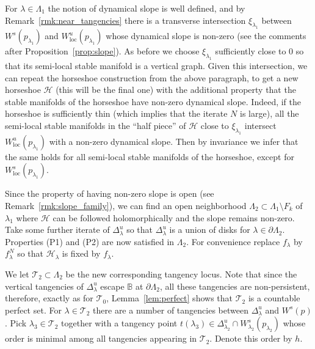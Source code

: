 \documentclass[11pt, oneside]{amsart}
\newcommand{\B}{\mathbb{B}}
\newcommand{\fr}{\partial}
\newcommand{\la}{\lambda}
\newcommand{\loc}{{\mathrm{loc}}}
\theoremstyle{remark}
\theoremstyle{definition}
\theoremstyle{theorem}
\newcommand{\commentaire}[1]{}
\begin{document}
 
For $\lambda\in \Lambda_1$ the notion of dynamical slope is 
well defined, and by Remark~\ref{rmk:near_tangencies} 
there is a transverse intersection  $\xi_{\lambda_1}$ between 
$W^s(p_{\la_1})$ and $W^u_\loc(p_{\la_1})$ 
whose dynamical slope is non-zero (see the comments after 
Proposition~\ref{prop:slope}). As before we choose $\xi_{\lambda_1}$ sufficiently close to 0 
so that its semi-local stable manifold is  a vertical graph.  
Given this intersection, we can repeat
 the horseshoe construction from the above paragraph, to get a new horseshoe $\mathcal H$ (this will be the final one)
 with the additional property 
that the stable manifolds of the horseshoe have non-zero dynamical slope. 
Indeed, if the horseshoe is sufficiently thin (which implies that the iterate $N$ is large), 
all the semi-local stable manifolds in the ``half  piece'' of $\mathcal H$ close to $\xi_{\lambda_1}$  
 intersect $W^u_\loc(p_{\lambda_1})$ with a non-zero dynamical slope. Then 
 by invariance we infer that   the same holds for all semi-local stable manifolds of the horseshoe, 
 except for $W^s_\loc(p_{\la_1})$.%

Since the property of having non-zero slope is open (see Remark~\ref{rmk:slope_family}), 
we can find     an open 
neighborhood $\Lambda_2\subset \Lambda_1\setminus F_k$\commentaire{cf. Minor comment \#4}
of $\lambda_1$ 
where $\mathcal H$ can be followed holomorphically and the slope remains non-zero. Take some further iterate of $\Delta^u_\lambda$ so that   $\Delta^u_\lambda$ is a union of disks for $\lambda\in \fr\Lambda_2$. 
 Properties (P1) and  (P2) are now satisfied in $\Lambda_2$.
   For convenience replace $f_\la$ by $f_\la^N$ so that 
  $\mathcal H_{\lambda}$ is fixed by $f_\lambda$.  
  
We let  $\mathcal T_2\subset \Lambda_2$ be the new corresponding 
  tangency locus. Note that since the vertical tangencies of 
  $\Delta^u_\lambda$ escape $\B$ 
at $\fr\Lambda_2$, all these tangencies are non-persistent,  therefore, 
 exactly as for $\mathcal T_0$,
   Lemma~\ref{lem:perfect} shows that  $\mathcal T_2$ is a countable perfect set. 
For $\lambda\in \mathcal T_2$ there are  a number of tangencies between $\Delta^u_\lambda$ and
$W^s(p)$. Pick $\lambda_3\in \mathcal T_2$ together with    
a tangency point $t(\lambda_3) \in \Delta^u_{\lambda_2}\cap W^s_{\lambda_2}(p_{\lambda_2})$
whose order is minimal among all tangencies appearing in $\mathcal T_2$. Denote this order 
by $h$. 
\end{document}
